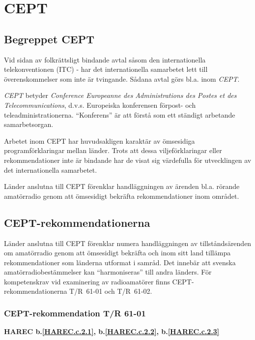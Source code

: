 \section{CEPT}


\subsection{Begreppet CEPT}

Vid sidan av folkrättsligt bindande avtal såsom den internationella
telekonventionen (ITC) - har det internationella samarbetet lett till
överenskommelser som inte är tvingande. Sådana avtal görs bl.a. inom
\emph{CEPT}.

\emph{CEPT} betyder \emph{Conference Europeanne des Administrations
  des Postes et des Telecommunications}, d.v.s. Europeiska konferensen
förpost- och teleadministrationerna. ``Konferens'' är att förstå som
ett ständigt arbetande samarbetsorgan.

Arbetet inom CEPT har huvudsakligen karaktär av ömsesidiga
programförklaringar mellan länder. Trots att dessa viljeförklaringar
eller rekommendationer inte är bindande har de visat sig värdefulla
för utvecklingen av det internationella samarbetet.

Länder anslutna till CEPT förenklar handläggningen av ärenden
bl.a. rörande amatörradio genom att ömsesidigt bekräfta
rekommendationer inom området.

\subsection{CEPT-rekommendationerna}

Länder anslutna till CEPT förenklar numera handläggningen av
tillståndsärenden om amatörradio genom att ömsesidigt bekräfta och
inom sitt land tillämpa rekommendationer som länderna utformat i
samråd. Det innebär att svenska amatörradiobestämmelser kan
``harmoniseras'' till andra länders.  För kompetenskrav vid
examinering av radioamatörer finns CEPT-rekommendationerna T/R~61-01
och T/R~61-02.

\subsubsection{CEPT-rekommendation T/R 61-01}
\textbf{
HAREC b.\ref{HAREC.c.2.1}\label{myHAREC.c.2.1},
 b.\ref{HAREC.c.2.2}\label{myHAREC.c.2.2},
 b.\ref{HAREC.c.2.3}\label{myHAREC.c.2.3}
}

